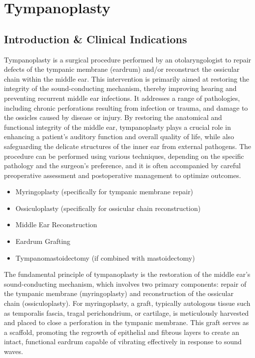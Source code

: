 \chapter{Tympanoplasty}

\section*{Introduction \& Clinical Indications}
Tympanoplasty is a surgical procedure performed by an otolaryngologist to repair defects of the tympanic membrane (eardrum) and/or reconstruct the ossicular chain within the middle ear. This intervention is primarily aimed at restoring the integrity of the sound-conducting mechanism, thereby improving hearing and preventing recurrent middle ear infections. It addresses a range of pathologies, including chronic perforations resulting from infection or trauma, and damage to the ossicles caused by disease or injury. By restoring the anatomical and functional integrity of the middle ear, tympanoplasty plays a crucial role in enhancing a patient's auditory function and overall quality of life, while also safeguarding the delicate structures of the inner ear from external pathogens. The procedure can be performed using various techniques, depending on the specific pathology and the surgeon's preference, and it is often accompanied by careful preoperative assessment and postoperative management to optimize outcomes.

\begin{itemize}
  \item Myringoplasty (specifically for tympanic membrane repair)
  \item Ossiculoplasty (specifically for ossicular chain reconstruction)
  \item Middle Ear Reconstruction
  \item Eardrum Grafting
  \item Tympanomastoidectomy (if combined with mastoidectomy)
\end{itemize}

The fundamental principle of tympanoplasty is the restoration of the middle ear's sound-conducting mechanism, which involves two primary components: repair of the tympanic membrane (myringoplasty) and reconstruction of the ossicular chain (ossiculoplasty). For myringoplasty, a graft, typically autologous tissue such as temporalis fascia, tragal perichondrium, or cartilage, is meticulously harvested and placed to close a perforation in the tympanic membrane. This graft serves as a scaffold, promoting the regrowth of epithelial and fibrous layers to create an intact, functional eardrum capable of vibrating effectively in response to sound waves.

